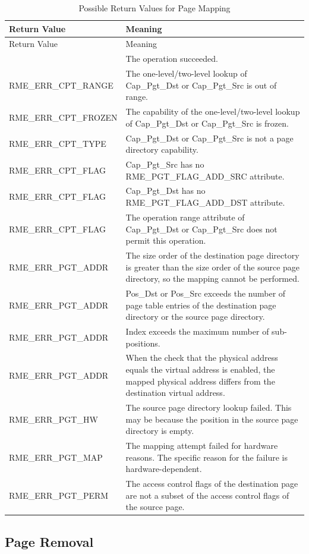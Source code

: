 \begin{xltabular}{\textwidth}{@{}>{\hsize\raggedright\arraybackslash}X>{\hsize\raggedright\arraybackslash}X@{}}
\caption{Possible Return Values for Page Mapping}\label{tab:3-15-map-memory-page-return-values}\\
\toprule
Return Value & Meaning\tabularnewline
\endfirsthead
\toprule
Return Value & Meaning\tabularnewline
\midrule
\endhead
\bottomrule
{} & The operation succeeded.\tabularnewline
    RME\_ERR\_CPT\_RANGE & The one-level/two-level lookup of Cap\_Pgt\_Dst or Cap\_Pgt\_Src is out of range.\tabularnewline
    RME\_ERR\_CPT\_FROZEN & The capability of the one-level/two-level lookup of Cap\_Pgt\_Dst or Cap\_Pgt\_Src is frozen.\tabularnewline
    RME\_ERR\_CPT\_TYPE & Cap\_Pgt\_Dst or Cap\_Pgt\_Src is not a page directory capability.\tabularnewline
    RME\_ERR\_CPT\_FLAG & Cap\_Pgt\_Src has no RME\_PGT\_FLAG\_ADD\_SRC attribute.\tabularnewline
    RME\_ERR\_CPT\_FLAG & Cap\_Pgt\_Dst has no RME\_PGT\_FLAG\_ADD\_DST attribute.\tabularnewline
    RME\_ERR\_CPT\_FLAG & The operation range attribute of Cap\_Pgt\_Dst or Cap\_Pgt\_Src does not permit this operation.\tabularnewline
    RME\_ERR\_PGT\_ADDR & The size order of the destination page directory is greater than the size order of the source page directory, so the mapping cannot be performed.\tabularnewline
    RME\_ERR\_PGT\_ADDR & Pos\_Dst or Pos\_Src exceeds the number of page table entries of the destination page directory or the source page directory.\tabularnewline
    RME\_ERR\_PGT\_ADDR & Index exceeds the maximum number of sub-positions.\tabularnewline
    RME\_ERR\_PGT\_ADDR & When the check that the physical address equals the virtual address is enabled, the mapped physical address differs from the destination virtual address.\tabularnewline
    RME\_ERR\_PGT\_HW & The source page directory lookup failed. This may be because the position in the source page directory is empty.\tabularnewline
    RME\_ERR\_PGT\_MAP & The mapping attempt failed for hardware reasons. The specific reason for the failure is hardware-dependent.\tabularnewline
    RME\_ERR\_PGT\_PERM & The access control flags of the destination page are not a subset of the access control flags of the source page.\tabularnewline
\end{xltabular}
\nopagebreak[4]

\subsection{Page Removal}\label{subsec:3-remove-memory-page}

